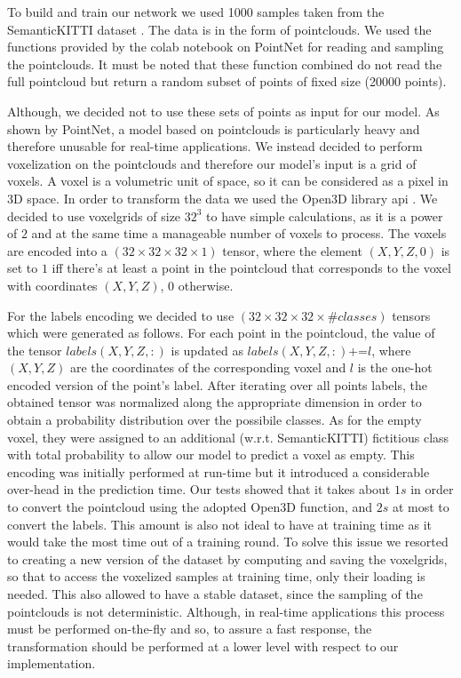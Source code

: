 To build and train our network we used 1000 samples taken from the SemanticKITTI dataset \cite{behley2019iccv}.
The data is in the form of pointclouds. We used the
functions provided by the colab notebook on PointNet for reading and sampling the pointclouds. It must be noted that these function combined
do not read the full pointcloud but return a random subset of points of fixed size (20000 points).\par
Although, we decided not to use these sets of points as input for our model. As shown by PointNet,
a model based on pointclouds is particularly heavy and therefore unusable for real-time applications.
We instead decided to perform voxelization on the pointclouds and therefore our model's input is a grid of voxels.
A voxel is a volumetric unit of space, so it can be considered as a pixel in 3D space.
In order to transform the data we used the Open3D library api \cite{zhou2018open3d}. 
We decided to use voxelgrids of size $32^3$ to have simple calculations, as it is a power of $2$ and at the same time a manageable number of voxels to process.
The voxels are encoded into a $(32\times32\times32\times1)$ tensor, where the element $(X,Y,Z,0)$ is set to $1$ iff there's at least a point in the pointcloud that corresponds to the voxel with coordinates $(X,Y,Z)$, 0 otherwise.\par
For the labels encoding we decided to use $(32\times32\times32\times\#classes)$ tensors which were generated as follows.
For each point in the pointcloud, the value of the tensor 
$labels(X,Y,Z,:)$ is updated as $labels(X,Y,Z,:)\textrm{+=}l$, where $(X,Y,Z)$ are the coordinates of the corresponding voxel and $l$ is the one-hot encoded version
of the point's label.
After iterating over all points labels, the obtained tensor was normalized along the appropriate dimension in order to obtain a probability distribution over the possibile classes. 
As for the empty voxel, they were assigned to an additional (w.r.t. SemanticKITTI) fictitious class with total probability to 
allow our model to predict a voxel as empty.
This encoding was initially performed at run-time but it introduced a considerable over-head in the prediction time. 
Our tests showed that it takes about $1s$ in order to convert the pointcloud
using the adopted Open3D function, and $2s$ at most to convert the labels. This amount
is also not ideal to have at training time as it would take the most time out of a training round. 
To solve this issue we resorted to creating a new version of the dataset by computing and saving the voxelgrids, so that to access the voxelized samples
at training time, only their loading is needed. This also allowed to have a stable dataset, since the sampling of the pointclouds
is not deterministic. Although, in real-time applications this process must be performed on-the-fly and so, to assure a fast response,
the transformation should be performed at a lower level with respect to our implementation.